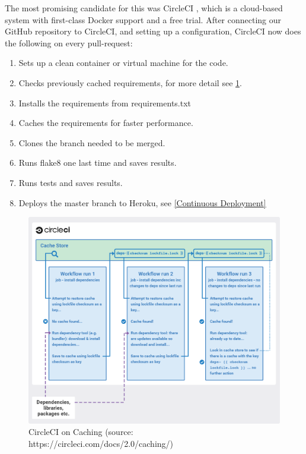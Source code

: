The most promising candidate for this was CircleCI \cite{CircleCI}, which is a cloud-based system with first-class Docker support and a free trial. After connecting our GitHub repository to CircleCI, and setting up a configuration, CircleCI now does the following on every pull-request:

\begin{enumerate}
    \item Sets up a clean container or virtual machine for the code.
    \item Checks previously cached requirements, for more detail see \figurename{\ref{cache_CI}}.
    \item Installs the requirements from requirements.txt
    \item Caches the requirements for faster performance.
    \item Clones the branch needed to be merged.
    \item Runs flake8 one last time and saves results.
    \item Runs tests and saves results.
    \item Deploys the master branch to Heroku, see \ref{Continuous Deployment}
\end{enumerate}

 \begin{figure}[H]
   \centering
   \includegraphics[width=\textwidth]{06Coding/05Pictures/cache_CI.png}
   \caption{CircleCI on Caching (source: https://circleci.com/docs/2.0/caching/)}
   \label{cache_CI}
\end{figure}

